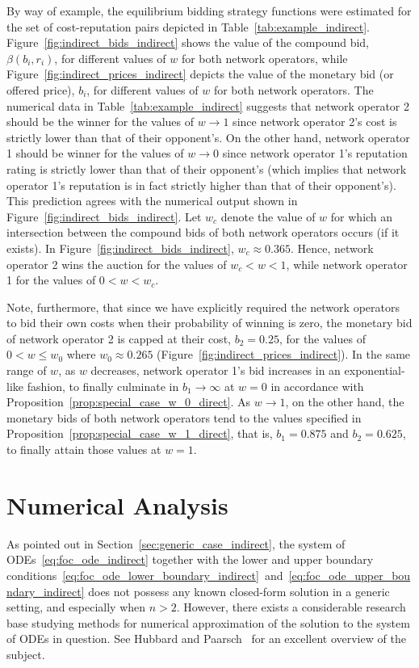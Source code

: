 By way of example, the equilibrium bidding strategy functions were estimated for the set of cost-reputation pairs depicted in Table~\ref{tab:example_indirect}. Figure~\ref{fig:indirect_bids_indirect} shows the value of the compound bid, $\beta(b_i,r_i)$, for different values of $w$ for both network operators, while Figure~\ref{fig:indirect_prices_indirect} depicts the value of the monetary bid (or offered price), $b_i$, for different values of $w$ for both network operators. The numerical data in Table~\ref{tab:example_indirect} suggests that network operator 2 should be the winner for the values of $w\rightarrow 1$ since network operator 2's cost is strictly lower than that of their opponent's. On the other hand, network operator 1 should be winner for the values of $w\rightarrow 0$ since network operator 1's reputation rating is strictly lower than that of their opponent's (which implies that network operator 1's reputation is in fact strictly higher than that of their opponent's). This prediction agrees with the numerical output shown in Figure~\ref{fig:indirect_bids_indirect}. Let $w_c$ denote the value of $w$ for which an intersection between the compound bids of both network operators occurs (if it exists). In Figure~\ref{fig:indirect_bids_indirect}, $w_c\approx 0.365$. Hence, network operator 2 wins the auction for the values of $w_c < w < 1$, while network operator 1 for the values of $0 < w < w_c$.

Note, furthermore, that since we have explicitly required the network operators to bid their own costs when their probability of winning is zero, the monetary bid of network operator 2 is capped at their cost, $b_2 = 0.25$, for the values of $0 < w \le w_0$ where $w_0\approx 0.265$ (Figure~\ref{fig:indirect_prices_indirect}). In the same range of $w$, as $w$ decreases, network operator 1's bid increases in an exponential-like fashion, to finally culminate in $b_1\to\infty$ at $w=0$ in accordance with Proposition~\ref{prop:special_case_w_0_direct}. As $w\to 1$, on the other hand, the monetary bids of both network operators tend to the values specified in Proposition~\ref{prop:special_case_w_1_direct}, that is, $b_1=0.875$ and $b_2=0.625$, to finally attain those values at $w=1$.

\section{Numerical Analysis} %
\label{sec:numerical_analysis_indirect}
As pointed out in Section~\ref{sec:generic_case_indirect}, the system of ODEs~\eqref{eq:foc_ode_indirect} together with the lower and upper boundary conditions~\eqref{eq:foc_ode_lower_boundary_indirect}~and~\eqref{eq:foc_ode_upper_boundary_indirect} does not possess any known closed-form solution in a generic setting, and especially when $n>2$. However, there exists a considerable research base studying methods for numerical approximation of the solution to the system of ODEs in question. See Hubbard and Paarsch~\cite{HubbardPaarsch2011} for an excellent overview of the subject.

